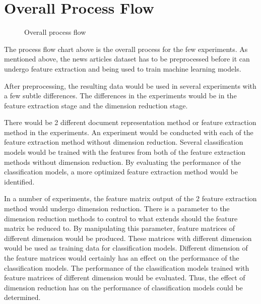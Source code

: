 \section{Overall Process Flow}
\begin{figure} [ht]
\centering
{}
\caption{Overall process flow}
\label{fig: overallFlow}
\end{figure}

The process flow chart above is the overall process for the few experiments. As mentioned above, the news articles dataset has to be preprocessed before it can undergo feature extraction and being used to train machine learning models.

After preprocessing, the resulting data would be used in several experiments with a few subtle differences.
The differences in the experiments would be in the feature extraction stage and the dimension reduction stage. 

There would be 2 different document representation method or feature extraction method in the experiments. An experiment would be conducted with each of the feature extraction method without dimension reduction. Several classification models would be trained with the features from both of the feature extraction methods without dimension reduction. By evaluating the performance of the classification models, a more optimized feature extraction method would be identified.

In a number of experiments, the feature matrix output of the 2 feature extraction method would undergo dimension reduction. There is a parameter to the dimension reduction methods to control to what extends should the feature matrix be reduced to. By manipulating this parameter, feature matrices of different dimension would be produced. These matrices with different dimension would be used as training data for classification models. Different dimension of the feature matrices would certainly has an effect on the performance of the classification models. The performance of the classification models trained with feature matrices of different dimension would be evaluated. Thus, the effect of dimension reduction has on the performance of classification models could be determined.

